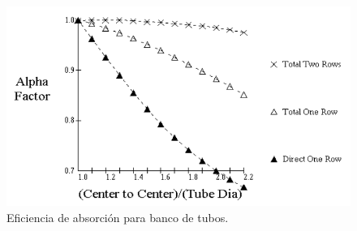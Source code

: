 \begin{figure}[hbt]
\begin{center}
\includegraphics[scale=0.45]{images/alpha}
\caption[Eficiencia de absorción para banco de tubos]{Eficiencia de absorción para banco de tubos.}
\label{fig:alpha}
\end{center}
\end{figure}

